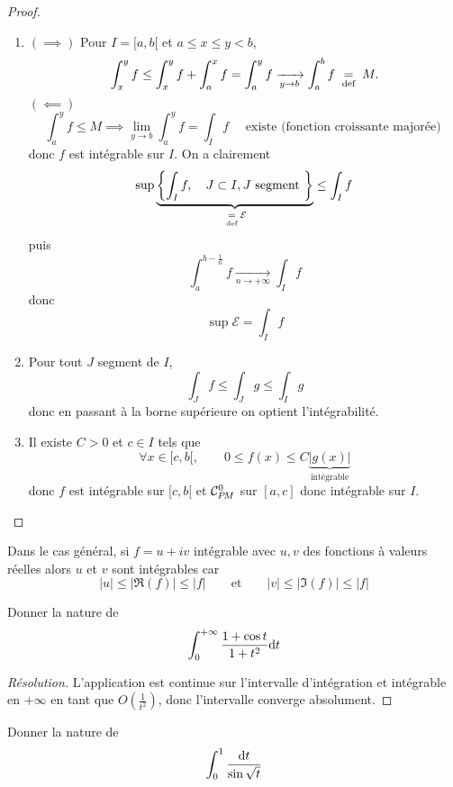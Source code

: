 \begin{proof}~
    \begin{enumerate}
        \item $(\implies)$ Pour $I=[a, b[$ et $a\leq x\leq y<b$, \[
                \int_x^yf\leq \int_x^yf+\int_a^xf=\int_a^yf\xrightarrow[y\to b]{}\int_a^bf\;\underset{\text{def}}=\; M.
            \]
            $(\impliedby)$ \[
                \int_a^yf\leq M\implies \lim_{y\to b}\int_a^yf=\int_If\quad \text{ existe (fonction croissante majorée) }
            \]
            donc $f$ est intégrable sur $I$. On a clairement \[
                \sup \underbrace{\left\{ \int_If,\quad J\subset I, J\text{ segment } \right\}}_{\;\underset{\text{def}}=\; \mathcal E}\leq \int_If
            \]
            puis \[
                \int_a^{b-\frac1n}f\xrightarrow[n\to+\infty]{}\int_If
            \]
            donc \[
                \sup \mathcal E=\int_If
            \]
        \item Pour tout $J$ segment de $I$, \[
                \int_Jf\leq \int_Jg\leq \int_I g
            \]
            donc en passant à la borne supérieure on optient l'intégrabilité.
        \item Il existe $C>0$ et $c\in I$ tels que \[
                \forall x\in [c, b[, \qquad 0\leq f(x)\leq C\underbrace{|g(x)|}_{\text{intégrable}}
            \]
            donc $f$ est intégrable sur $[c, b[$ et $\CPM$ sur $[a, c]$ donc intégrable sur $I$.
    \end{enumerate}
\end{proof}

\begin{rem}
    Dans le cas général, si $f=u+iv$ intégrable avec $u,v$ des fonctions à valeurs réelles alors $u$ et $v$ sont intégrables car \[
        |u|\leq |\Re (f)|\leq |f|\qquad\text{et}\qquad |v|\leq |\Im(f)|\leq |f|
    \]
\end{rem}

\begin{exo}
    Donner la nature de \[
        \int_0^{+\infty}\frac{1+\cos t}{1+t^2}\mathrm{d} t
    \]
\end{exo}

\begin{proof}[Résolution] L'application est continue sur l'intervalle d'intégration et intégrable en $+\infty$ en tant que $O(\frac1{t^2})$, donc l'intervalle converge absolument.
\end{proof}

\begin{exo}
    Donner la nature de \[
        \int_0^1\frac{\mathrm{d} t}{\sin\sqrt t}
    \]
\end{exo}

